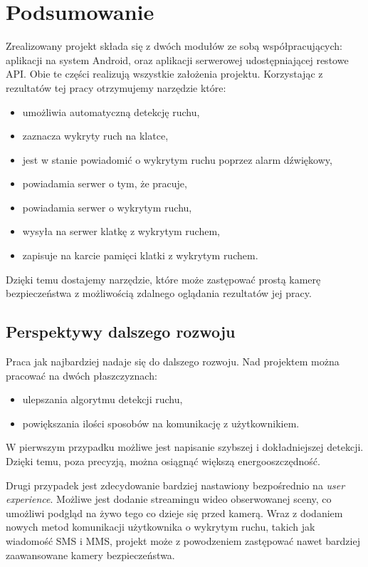 \chapter{Podsumowanie}
\label{cha:podsumowanie}

Zrealizowany projekt składa się z dwóch modułów ze sobą współpracujących: aplikacji na system Android, oraz aplikacji serwerowej udostępniającej restowe API. Obie te części realizują wszystkie założenia projektu. Korzystając z rezultatów tej pracy otrzymujemy narzędzie które:

\begin{itemize}
	\item umożliwia automatyczną detekcję ruchu,
	\item zaznacza wykryty ruch na klatce, 
	\item jest w stanie powiadomić o wykrytym ruchu poprzez alarm dźwiękowy,
	\item powiadamia serwer o tym, że pracuje, 
	\item powiadamia serwer o wykrytym ruchu, 
	\item wysyła na serwer klatkę z wykrytym ruchem,
	\item zapisuje na karcie pamięci klatki z wykrytym ruchem.
\end{itemize}

Dzięki temu dostajemy narzędzie, które może zastępować prostą kamerę bezpieczeństwa z możliwością zdalnego oglądania rezultatów jej pracy.

\section{Perspektywy dalszego rozwoju}

Praca jak najbardziej nadaje się do dalszego rozwoju. Nad projektem można pracować na dwóch płaszczyznach:
\begin{itemize}
	\item ulepszania algorytmu detekcji ruchu, 
	\item powiększania ilości sposobów na komunikację z użytkownikiem.
\end{itemize}

W pierwszym przypadku możliwe jest napisanie szybszej i dokładniejszej detekcji. Dzięki temu, poza precyzją, można osiągnąć większą energooszczędność. 

Drugi przypadek jest zdecydowanie bardziej nastawiony bezpośrednio na {\it user experience}. Możliwe jest dodanie streamingu wideo obserwowanej sceny, co umożliwi podgląd na żywo tego co dzieje się przed kamerą. Wraz z dodaniem nowych metod komunikacji użytkownika o wykrytym ruchu, takich jak wiadomość SMS i MMS, projekt może z powodzeniem zastępować nawet bardziej zaawansowane kamery bezpieczeństwa. 

